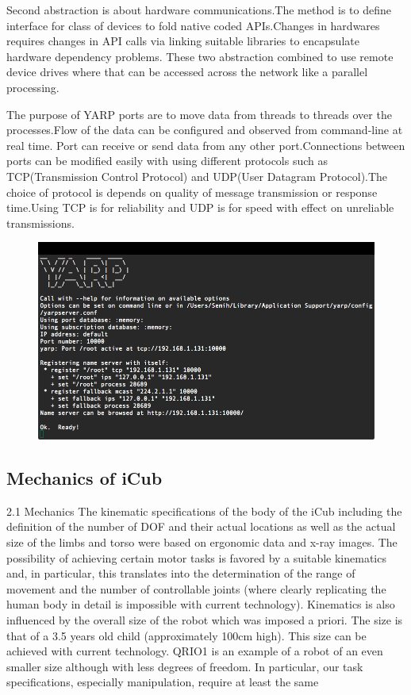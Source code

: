\documentclass[a4paper, 11pt]{report}
\begin{document}
  Second abstraction is about hardware communications.The method is to define 
  interface for class of devices to fold native coded APIs.Changes in hardwares 
  requires changes in API calls via linking suitable libraries to encapsulate 
  hardware dependency problems. These two abstraction combined to use remote 
  device drives where that can be accessed across the network like a parallel 
  processing.
  
  The purpose of YARP ports are to move data from threads to threads over the 
  processes.Flow of the data can be configured and observed from command-line 
  at 
  real time. Port can receive or send data from any other port.Connections 
  between ports can be modified easily with using different protocols such as 
  TCP(Transmission Control Protocol) and UDP(User Datagram Protocol).The choice 
  of protocol is depends on quality of message transmission or response 
  time.Using TCP is for reliability and UDP is for speed with effect on 
  unreliable transmissions.
  \begin{figure}[h!]
    \centering
    \includegraphics[width=0.8\linewidth]{yarp}
    \caption{}
    \label{fig:yarp}
  \end{figure}
  \newpage
  \subsection{Mechanics of iCub}
  
  2.1 Mechanics
  The kinematic specifications of the body of the iCub including the definition 
  of the number of DOF and their actual locations as well as the actual size of 
  the limbs and torso were based on ergonomic data and x-ray images.
  The possibility of achieving certain motor tasks is favored by a suitable 
  kinematics and, in particular, this translates into the determination of the 
  range of movement and the number of controllable joints (where clearly 
  replicating the human body in detail is impossible with current technology). 
  Kinematics is also influenced by the overall size of the robot which was 
  imposed a priori. The size is that of a 3.5 years old child (approximately 
  100cm high). This size can be achieved with current technology. QRIO1 is an 
  example of a robot of an even smaller size although with less degrees of 
  freedom. In particular, our task specifications, especially manipulation, 
  require at least the same
  
\end{document}
